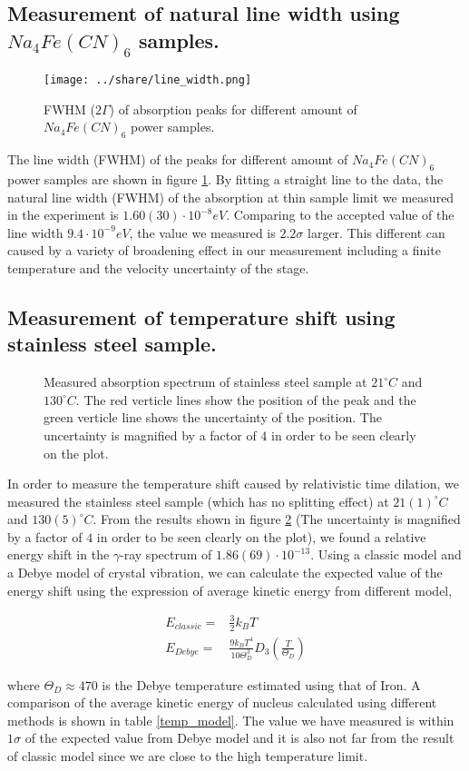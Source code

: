 \documentclass[aps,twocolumn,secnumarabic,balancelastpage,amsmath,amssymb,nofootinbib]{revtex4}
\newcommand{\eqar}[1]
{
  \begin{align*}
    #1
  \end{align*}
}
\newcommand{\dexp}[2]{\ensuremath{{#1}\cdot10^{#2}}}
\newcommand{\paren}[1]{{\left({#1}\right)}}
\begin{document}
\subsection{Measurement of natural line width using $Na_4Fe(CN)_6$ samples.}
\begin{figure}
  \texttt{[image: ../share/line\_width.png]}
  \caption{FWHM ($2\Gamma$) of absorption peaks for different amount of $Na_4Fe(CN)_6$ power samples.}
  \label{line_width}
\end{figure}
The line width (FWHM) of the peaks for different amount of $Na_4Fe(CN)_6$ power samples are shown in figure \ref{line_width}. By fitting a straight line to the data, the natural line width (FWHM) of the absorption at thin sample limit we measured in the experiment is $\dexp{1.60(30)}{-8}eV$. Comparing to the accepted value of the line width $\dexp{9.4}{-9}eV$, the value we measured is $2.2\sigma$ larger. This different can caused by a variety of broadening effect in our measurement including a finite temperature and the velocity uncertainty of the stage.

\subsection{Measurement of temperature shift using stainless steel sample.}
\begin{figure}
  \caption{Measured absorption spectrum of stainless steel sample at  $21^{\circ}C$ and  $130^{\circ}C$. The red verticle lines show the position of the peak and the green verticle line shows the uncertainty of the position. The uncertainty is magnified by a factor of $4$ in order to be seen clearly on the plot.}
  \label{temp_raw}
\end{figure}
In order to measure the temperature shift caused by relativistic time dilation, we measured the stainless steel sample (which has no splitting effect) at $21(1)^{\circ}C$ and $130(5)^{\circ}C$. From the results shown in figure \ref{temp_raw} (The uncertainty is magnified by a factor of $4$ in order to be seen clearly on the plot), we found a relative energy shift in the $\gamma$-ray spectrum of $1.86(69)\cdot 10^{-13}$. Using a classic model and a Debye model of crystal vibration, we can calculate the expected value of the energy shift using the expression of average kinetic energy from different model,
\eqar{
  E_{classic}=&\frac32k_BT\\
  E_{Debye}=&\frac{9k_BT^4}{10\Theta_D^3}D_3\paren{\frac{T}{\Theta_D}}
}
where $\Theta_D\approx470$ is the Debye temperature estimated using that of Iron. A comparison of the average kinetic energy of nucleus calculated using different methods is shown in table \ref{temp_model}. The value we have measured is within $1\sigma$ of the expected value from Debye model and it is also not far from the result of classic model since we are close to the high temperature limit.
\end{document}
